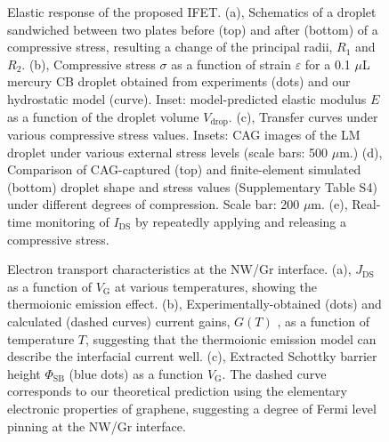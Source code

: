 \begin{figure}[htbp]
\centering
\caption{\label{fig:small-main-4}
Elastic response of the proposed IFET. (a), Schematics of a droplet sandwiched between two plates before (top) and after (bottom) of a compressive stress, resulting a change of the principal radii, \(R_{1}\) and \(R_{2}\). (b), Compressive stress \(\sigma\) as a function of strain \(\varepsilon\) for a 0.1 \(\mu\)L mercury CB droplet obtained from experiments (dots) and our hydrostatic model (curve). Inset: model-predicted elastic modulus \(E\) as a function of the droplet volume \(V_{\mathrm{drop}}\). (c), Transfer curves under various compressive stress values. Insets: CAG images of the LM droplet under various external stress levels (scale bars: 500 \(\mu\)m.) (d), Comparison of CAG-captured (top) and finite-element simulated (bottom) droplet shape and stress values (Supplementary Table S4) under different degrees of compression. Scale bar: 200 \(\mu\)m. (e), Real-time monitoring of \(I_{\mathrm{DS}}\) by repeatedly applying and releasing a compressive stress.}
\end{figure}


\begin{figure}[htbp]
\centering
\caption{\label{fig:small-main-5}
Electron transport characteristics at the NW/Gr interface. (a), \(J_{\mathrm{DS}}\) as a function of \(V_{\mathrm{G}}\) at various temperatures, showing the thermoionic emission effect. (b), Experimentally-obtained (dots) and calculated (dashed curves) current gains, \(G(T)\) , as a function of temperature \(T\), suggesting that the thermoionic emission model can describe the interfacial current well. (c), Extracted Schottky barrier height \(\Phi_{\mathrm{SB}}\) (blue dots) as a function \(V_{\mathrm{G}}\). The dashed curve corresponds to our theoretical prediction using the elementary electronic properties of graphene, suggesting a degree of Fermi level pinning at the NW/Gr interface.}
\end{figure}



